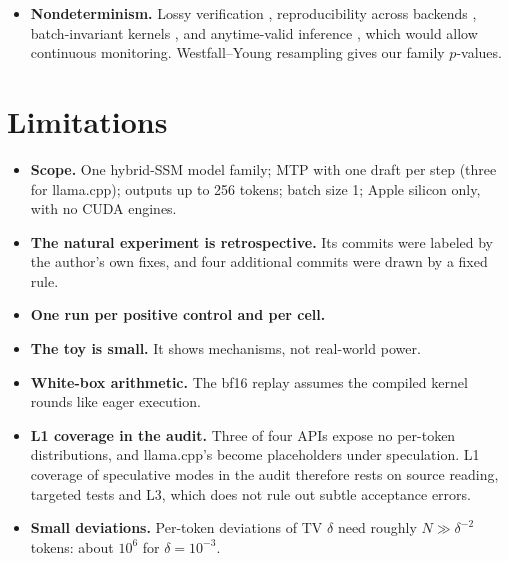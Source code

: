 \documentclass[10pt]{article}
\theoremstyle{remark}
\begin{document}
\begin{itemize}
\begin{itemize}
  \item ``Lossless but Not Free'' \cite{lossless2026} uses a $\chi^2$ test.
  \item An upstream llama.cpp report counted the token that follows a given first generated token after a fixed prompt, on a tiny random model \cite{llamacpp29975}.
  \end{itemize}
  Section~\ref{sec:toy} compares first-token counting with L1.
\item \textbf{Nondeterminism.} Lossy verification \cite{lossy2026}, reproducibility across backends \cite{silent2026,yuan2025}, batch-invariant kernels \cite{tm2025}, and anytime-valid inference \cite{ramdas2023}, which would allow continuous monitoring. Westfall--Young resampling \cite{westfallyoung1993} gives our family $p$-values.
\end{itemize}

\section{Limitations}
\begin{itemize}
\item \textbf{Scope.} One hybrid-SSM model family; MTP with one draft per step (three for llama.cpp); outputs up to 256 tokens; batch size 1; Apple silicon only, with no CUDA engines.
\item \textbf{The natural experiment is retrospective.} Its commits were labeled by the author's own fixes, and four additional commits were drawn by a fixed rule.
\item \textbf{One run per positive control and per cell.}
\item \textbf{The toy is small.} It shows mechanisms, not real-world power.
\item \textbf{White-box arithmetic.} The bf16 replay assumes the compiled kernel rounds like eager execution.
\item \textbf{L1 coverage in the audit.} Three of four APIs expose no per-token distributions, and llama.cpp's become placeholders under speculation. L1 coverage of speculative modes in the audit therefore rests on source reading, targeted tests and L3, which does not rule out subtle acceptance errors.
\item \textbf{Small deviations.} Per-token deviations of TV $\delta$ need roughly $N\gg\delta^{-2}$ tokens: about $10^6$ for $\delta=10^{-3}$.
\end{itemize}
\end{document}
